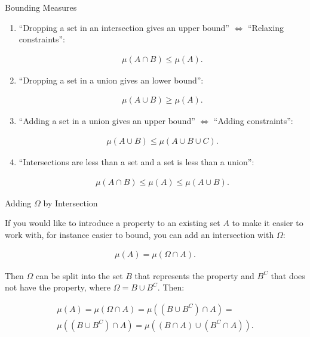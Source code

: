 \documentclass[10pt,landscape]{article}
\renewcommand{\leq}{\leqslant}
\renewcommand{\geq}{\geqslant}
\begin{document}
\begin{multicols}{3}
\begin{observation}{}{Bounding Measures}
    \begin{enumerate}
        \item ``Dropping a set in an intersection gives an upper bound'' $\Leftrightarrow$ ``Relaxing constraints'':

            \begin{align*}
                \mu(A \cap B) \leq \mu(A).
            \end{align*}
        \item ``Dropping a set in a union gives an lower bound'':

            \begin{align*}
                \mu(A \cup B) \geq \mu(A).
            \end{align*}
        \item ``Adding a set in a union gives an upper bound'' $\Leftrightarrow$ ``Adding constraints'':

            \begin{align*}
                \mu(A \cup B) \leq \mu(A \cup B \cup C).
            \end{align*}
        \item ``Intersections are less than a set and a set is less than a union'':

            \begin{align*}
                \mu(A \cap B) \leq \mu(A) \leq \mu(A \cup B).
            \end{align*}
    \end{enumerate}

\end{observation}

\begin{observation}{}{Adding $\Omega$ by Intersection}

    If you would like to introduce a property to an existing set $A$ to make it easier to work with, for instance easier to bound, you can add an intersection with $\Omega$:

        \begin{align*}
            \mu(A) = \mu(\Omega \cap A).
        \end{align*}

    Then $\Omega$ can be split into the set $B$ that represents the property and $B^C$ that does not have the property, where $\Omega = B \cup B^C$. Then:

        \begin{align*}
            \mu(A) = \mu(\Omega \cap A) = \mu((B \cup B^C) \cap A) = \\
            \mu((B \cup B^C) \cap A) = \mu((B \cap A) \cup (B^C \cap A)).
        \end{align*}


\end{observation}
\end{multicols}
\end{document}
